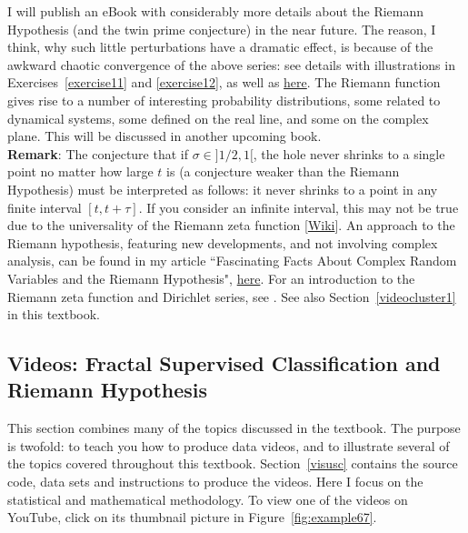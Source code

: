 \documentclass[10pt]{article}
\begin{document}
I will publish an eBook with considerably more details about the Riemann Hypothesis (and the twin prime conjecture) in the near future. The reason, I think, why such little perturbations have a dramatic effect, is because of the awkward \textcolor{index}{chaotic convergence} of the above series: see details with illustrations in Exercises~\ref{exercise11} and \ref{exercise12}, as well as \href{https://mathoverflow.net/questions/379650/more-mysteries-about-the-zeros-of-the-riemann-zeta-function}{here}. The Riemann function gives rise to a number of interesting probability distributions, some related to dynamical systems, some defined on the real line, and some on the complex plane. This will be discussed in another upcoming book.  \vspace{1ex} \\
{\bf Remark}: The conjecture that if $\sigma\in]1/2,1[$, the hole never shrinks to a single point no matter how large $t$ is (a conjecture weaker than the Riemann Hypothesis) must be interpreted as follows: it never shrinks to a point in any finite interval $[t,t+\tau]$.
If you consider an infinite interval, this may not be true due to the universality of the Riemann
zeta function [\href{https://en.wikipedia.org/wiki/Zeta_function_universality}{Wiki}]. An approach to the Riemann hypothesis, featuring new developments, and not involving complex analysis, can be found in my article ``Fascinating Facts About Complex Random Variables and the Riemann Hypothesis", \href{https://www.vgranville.com/2022/02/fascinating-facts-about-complex-random.html}{here}. For an introduction to the Riemann zeta function and Dirichlet series, see \cite{ivic}. See also Section~\ref{videocluster1} in this textbook.

\subsection{Videos: Fractal Supervised Classification and Riemann Hypothesis}\label{videocluster}

This section combines many of the topics discussed in the textbook. The purpose is twofold: to teach you how to produce data videos, and to illustrate several of the topics covered throughout this textbook. Section~\ref{visusc} contains the source code, data sets and instructions to produce the videos. Here I focus on the statistical and mathematical methodology. To view one of the videos on YouTube, click on its thumbnail picture in Figure~\ref{fig:example67}.
\end{document}
